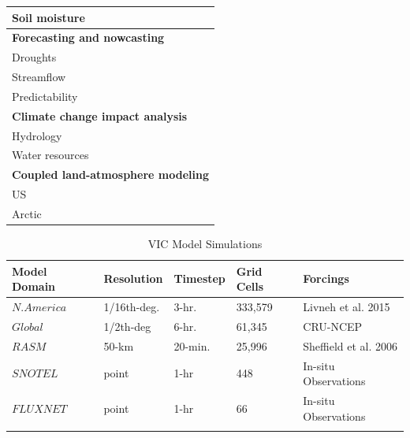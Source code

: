 \documentclass[gmd, manuscript]{copernicus}
\begin{document}
\begin{table}[]
{\begin{tabular}{ll}
    \multicolumn{1}{l|}{Soil moisture}           & \citet{Pan_2006}  \\ \hline
    \multicolumn{2}{l}{\textbf{Forecasting and nowcasting}}                                                                                                         \\ \hline
    \multicolumn{1}{l|}{Droughts}                & \citet{Shukla_2011}  \\ \hline
    \multicolumn{1}{l|}{Streamflow}              & \citet{Hamlet_1999,Li_2009,Wood_2002}  \\ \hline
    \multicolumn{1}{l|}{Predictability}          & \citet{Gebregiorgis_2011,Maurer_2003}  \\ \hline
    \multicolumn{2}{l}{\textbf{Climate change impact analysis}}                                                                                                     \\ \hline
    \multicolumn{1}{l|}{Hydrology}               & \citet{Barnett_2005,Beyene_2010,Nijssen_2001b}  \\ \hline
    \multicolumn{1}{l|}{Water resources}         & \citet{Christensen_2007,Christensen_2004,Das_2011,Hamlet_1999}  \\ \hline
    \multicolumn{2}{l}{\textbf{Coupled land-atmosphere modeling}}                                                                                                     \\ \hline
    \multicolumn{1}{l|}{US}                      & \citet{Zhu_2009}                                           \\ \hline
    \multicolumn{1}{l|}{Arctic}                  & \citet{Hamman_2016a} \\ \hline
  \end{tabular}
  }
\end{table}

\clearpage
\begin{table}
  \caption{VIC Model Simulations}
  \centering
  \begin{tabular}{l l l l l}
    \hline
    Model Domain  & Resolution  & Timestep  & Grid Cells  & Forcings  \\
    \hline
    $N.America$     & 1/16th-deg.  & 3-hr.   & 333,579 & Livneh et al. 2015   \\
    $Global$    & 1/2th-deg    & 6-hr.   & 61,345  & CRU-NCEP   \\
    $RASM$      & 50-km        & 20-min. & 25,996  & Sheffield et al. 2006  \\
    $SNOTEL$    & point        & 1-hr    & 448     & In-situ Observations  \\
    $FLUXNET$   & point        & 1-hr    & 66      & In-situ Observations  \\
    \hline
    \label{table:model_sims}
  \end{tabular}
\end{table}
\end{document}
